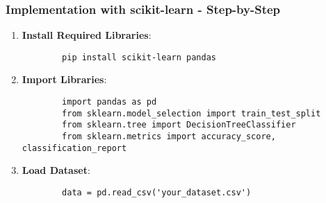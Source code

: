 \documentclass[aspectratio=169]{beamer}
\begin{document}
\begin{frame}[fragile]
    \frametitle{Implementation with scikit-learn - Step-by-Step}
    \begin{enumerate}
        \item \textbf{Install Required Libraries}:
        \begin{lstlisting}
        pip install scikit-learn pandas
        \end{lstlisting}
        
        \item \textbf{Import Libraries}:
        \begin{lstlisting}
        import pandas as pd
        from sklearn.model_selection import train_test_split
        from sklearn.tree import DecisionTreeClassifier
        from sklearn.metrics import accuracy_score, classification_report
        \end{lstlisting}
        
        \item \textbf{Load Dataset}:
        \begin{lstlisting}
        data = pd.read_csv('your_dataset.csv')
        \end{lstlisting}
    \end{enumerate}
\end{frame}
\end{document}
